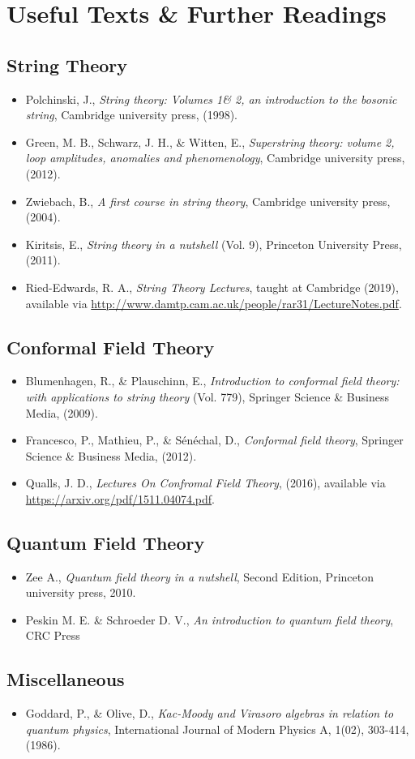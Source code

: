 \chapter*{Useful Texts \& Further Readings}

\section*{String Theory}
\begin{itemize}
    \item Polchinski, J., \textit{String theory: Volumes 1\& 2, an introduction to the bosonic string}, Cambridge university press, (1998).
    \item Green, M. B., Schwarz, J. H., \& Witten, E., \textit{Superstring theory: volume 2, loop amplitudes, anomalies and phenomenology}, Cambridge university press, (2012).
    \item Zwiebach, B., \textit{A first course in string theory}, Cambridge university press, (2004).
    \item Kiritsis, E., \textit{String theory in a nutshell} (Vol. 9), Princeton University Press, (2011).
    \item Ried-Edwards, R. A., \textit{String Theory Lectures}, taught at Cambridge (2019), available via \href{http://www.damtp.cam.ac.uk/people/rar31/LectureNotes.pdf}{http://www.damtp.cam.ac.uk/people/rar31/LectureNotes.pdf}.
\end{itemize}

\section*{Conformal Field Theory}
\begin{itemize}
    \item Blumenhagen, R., \& Plauschinn, E., \textit{Introduction to conformal field theory: with applications to string theory} (Vol. 779), Springer Science \& Business Media, (2009).
    \item Francesco, P., Mathieu, P., \& Sénéchal, D., \textit{Conformal field theory}, Springer Science \& Business Media, (2012).
    \item Qualls, J. D., \textit{Lectures On Confromal Field Theory}, (2016), available via \\
    \href{https://arxiv.org/pdf/1511.04074.pdf}{https://arxiv.org/pdf/1511.04074.pdf}.
\end{itemize}

\section*{Quantum Field Theory}
\begin{itemize}
    \item  Zee A., \textit{Quantum field theory in a nutshell}, Second Edition, Princeton university press, 2010.
    \item Peskin M. E. \& Schroeder D. V., \textit{An introduction to quantum field theory}, CRC Press
\end{itemize}

\section*{Miscellaneous}
\begin{itemize}
    \item Goddard, P., \& Olive, D., \textit{Kac-Moody and Virasoro algebras in relation to quantum physics}, International Journal of Modern Physics A, 1(02), 303-414, (1986).
\end{itemize}